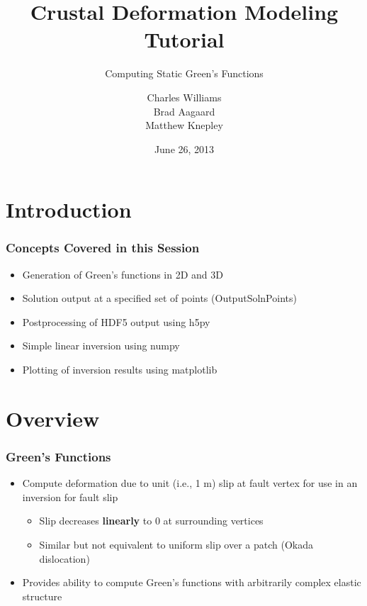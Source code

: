\documentclass{beamer}
\title{Crustal Deformation Modeling Tutorial}
\subtitle{Computing Static Green's Functions}
\author{Charles Williams \\
  Brad Aagaard \\
  Matthew Knepley}
\institute{\texttt{[image: ../../logos/cig\_blackfg]}}
\date{June 26, 2013}
\newcommand{\pylith}[1]{{\color{green}#1}}
\newcommand{\python}[1]{{\color{red}#1}}
\begin{document}
\maketitle


\section{Introduction}

\begin{frame}
  \frametitle{Concepts Covered in this Session}
  \summary{}

  \begin{itemize}
  \item Generation of Green's functions in 2D and 3D
  \item Solution output at a specified set of points (\pylith{OutputSolnPoints})
  \item Postprocessing of HDF5 output using \python{h5py}
  \item Simple linear inversion using \python{numpy}
  \item Plotting of inversion results using \python{matplotlib}
  \end{itemize}
  
\end{frame}


\section{Overview}

\begin{frame}
  \frametitle{Green's Functions}
  \summary{}

  \begin{itemize}
  \item Compute deformation due to unit (i.e., 1 m) slip at fault
    vertex for use in an inversion for fault slip
    \begin{itemize}
    \item Slip decreases {\bf linearly} to 0 at surrounding vertices
    \item Similar but not equivalent to uniform slip over a patch
      (Okada dislocation)
    \end{itemize}
  \item Provides ability to compute Green's functions with arbitrarily
    complex elastic structure
  \end{itemize}
  
\end{frame}
\end{document}
